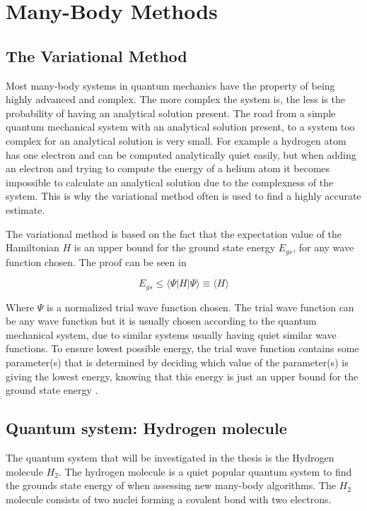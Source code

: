 \documentclass[../main.tex]{subfiles}
\begin{document}
\chapter{Many-Body Methods}
\label{sec:fourth}
\section{The Variational Method}
\label{section:TVM}
Most many-body systems in quantum mechanics have the property of being highly advanced and complex. The more complex the system is, the less is the probability of having an analytical solution present. The road from a simple quantum mechanical system with an analytical solution present, to a system too complex for an analytical solution is very small. For example a hydrogen atom has one electron and can be computed analytically quiet easily, but when adding an electron and trying to compute the energy of a helium atom it becomes impossible to calculate an analytical solution due to the complexness of the system. This is why the variational method often is used to find a highly accurate estimate.

The variational method is based on the fact that the expectation value of the Hamiltonian $H$ is an upper bound for the ground state energy \ensuremath{E_{gs}}, for any wave function chosen. The proof can be seen in \cite[ch.~8, p.~327]{griffiths_schroeter_2018}

\begin{equation}
    E_{gs}\leq \langle \Psi | H | \Psi \rangle \equiv \langle  H  \rangle
    \label{eq:Egs}
\end{equation}

Where \ensuremath{\Psi} is a normalized trial wave function chosen. The trial wave function can be any wave function but it is usually chosen according to the quantum mechanical system, due to similar systems usually having quiet similar wave functions. To ensure lowest possible energy, the trial wave function contains some parameter(s) that is determined by deciding which value of the parameter(s) is giving the lowest energy, knowing that this energy is just an upper bound for the ground state energy \cite{griffiths_schroeter_2018}.

\section{Quantum system: Hydrogen molecule}
The quantum system that will be investigated in the thesis is the Hydrogen molecule $H_2$. The hydrogen molecule is a quiet popular quantum system to find the grounds state energy of when assessing new many-body algorithms. The $H_2$ molecule consists of two nuclei forming a covalent bond with two electrons.
\end{document}
